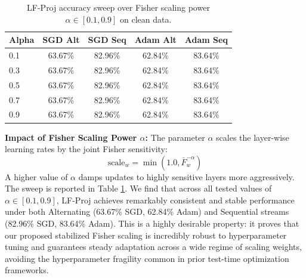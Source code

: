 \documentclass{article}
\theoremstyle{plain}
\theoremstyle{definition}
\theoremstyle{remark}
\begin{document}
\begin{table}[h]
\caption{LF-Proj accuracy sweep over Fisher scaling power $\alpha \in [0.1, 0.9]$ on clean data.}
\label{tab:alpha_sweep}
\vskip 0.15in
\begin{center}
\begin{small}
\begin{sc}
\setlength{\tabcolsep}{5pt}
\begin{tabular}{lcccc}
\toprule
Alpha & SGD Alt & SGD Seq & Adam Alt & Adam Seq \\
\midrule
0.1 & 63.67\% & 82.96\% & 62.84\% & 83.64\% \\
0.3 & 63.67\% & 82.96\% & 62.84\% & 83.64\% \\
0.5 & 63.67\% & 82.96\% & 62.84\% & 83.64\% \\
0.7 & 63.67\% & 82.96\% & 62.84\% & 83.64\% \\
0.9 & 63.67\% & 82.96\% & 62.84\% & 83.64\% \\
\bottomrule
\end{tabular}
\end{sc}
\end{small}
\end{center}
\vskip -0.1in
\end{table}

\textbf{Impact of Fisher Scaling Power $\alpha$:} The parameter $\alpha$ scales the layer-wise learning rates by the joint Fisher sensitivity:
\begin{equation}
    \text{scale}_w = \min\left(1.0, \bar{F}_w^{-\alpha}\right)
\end{equation}
A higher value of $\alpha$ damps updates to highly sensitive layers more aggressively. The sweep is reported in Table \ref{tab:alpha_sweep}.
We find that across all tested values of $\alpha \in [0.1, 0.9]$, LF-Proj achieves remarkably consistent and stable performance under both Alternating (63.67\% SGD, 62.84\% Adam) and Sequential streams (82.96\% SGD, 83.64\% Adam). This is a highly desirable property: it proves that our proposed stabilized Fisher scaling is incredibly robust to hyperparameter tuning and guarantees steady adaptation across a wide regime of scaling weights, avoiding the hyperparameter fragility common in prior test-time optimization frameworks.
\end{document}
